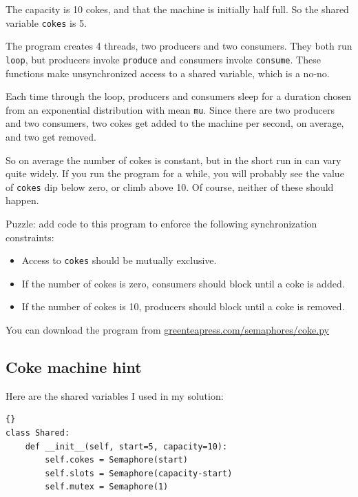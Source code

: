 \documentclass{book}
\newcommand{\clearemptydoublepage}{\newpage\cleardoublepage}
\begin{document}
The capacity is 10 cokes, and that the machine is initially
half full.  So the shared variable {\tt cokes} is 5.

The program creates 4 threads, two producers and two consumers.
They both run {\tt loop}, but producers invoke {\tt produce}
and consumers invoke {\tt consume}.  These functions make
unsynchronized access to a shared variable, which is a no-no.

Each time through the loop, producers and consumers sleep for a
duration chosen from an exponential distribution with mean {\tt mu}.
Since there are two producers and two consumers, two cokes get added
to the machine per second, on average, and two get removed.

So on average the number of cokes is constant, but in the short
run in can vary quite widely.  If you run the program for a
while, you will probably see the value of {\tt cokes} dip
below zero, or climb above 10.  Of course, neither of these
should happen.

Puzzle: add code to this program to enforce the following
synchronization constraints:

\begin{itemize}

\item Access to {\tt cokes} should be mutually exclusive.

\item If the number of cokes is zero, consumers should block
until a coke is added.

\item If the number of cokes is 10, producers should block
until a coke is removed.

\end{itemize}

You can download the program from
\url{greenteapress.com/semaphores/coke.py}


\clearemptydoublepage
\subsection {Coke machine hint}

Here are the shared variables I used in my solution:

\begin{latin}
\begin{lstlisting}[title={}]{}
class Shared:
    def __init__(self, start=5, capacity=10):
        self.cokes = Semaphore(start)
        self.slots = Semaphore(capacity-start)
        self.mutex = Semaphore(1)
\end{lstlisting}
\end{latin}
\end{document}
